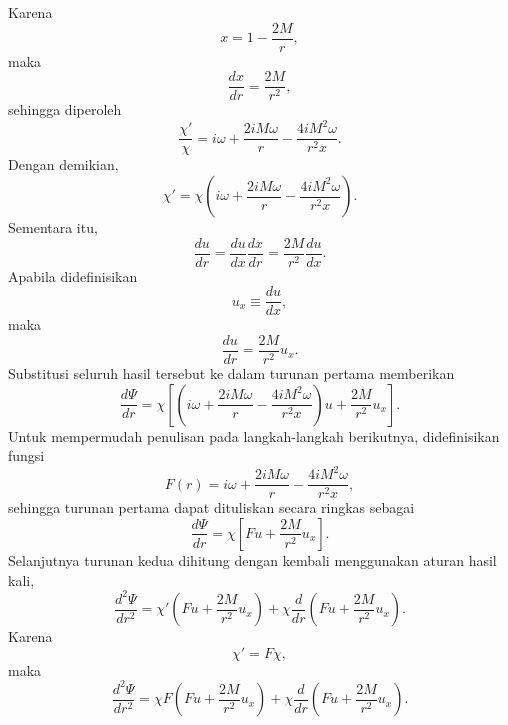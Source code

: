 Karena
\begin{equation}
    x = 1-\frac{2M}{r},
\end{equation}
maka
\begin{equation}
    \frac{dx}{dr} = \frac{2M}{r^2},
\end{equation}
sehingga diperoleh
\begin{equation}
    \boxed{ \frac{\chi'}{\chi} = i\omega + \frac{2iM\omega}{r} - \frac{4iM^2\omega}{r^2x} }.
\end{equation}
Dengan demikian,
\begin{equation}
    \boxed{ \chi' = \chi \left( i\omega + \frac{2iM\omega}{r} - \frac{4iM^2\omega}{r^2x} \right). }
\end{equation}
Sementara itu,
\begin{equation}
    \frac{du}{dr} = \frac{du}{dx} \frac{dx}{dr} = \frac{2M}{r^2} \frac{du}{dx}.
\end{equation}
Apabila didefinisikan
\begin{equation}
    u_x \equiv \frac{du}{dx},
\end{equation}
maka
\begin{equation}
    \frac{du}{dr} = \frac{2M}{r^2}u_x.
\end{equation}
Substitusi seluruh hasil tersebut ke dalam turunan pertama memberikan
\begin{equation}
    \boxed{ \frac{d\Psi}{dr} = \chi \left[ \left( i\omega + \frac{2iM\omega}{r} - \frac{4iM^2\omega}{r^2x} \right)u + \frac{2M}{r^2}u_x \right]. }
\end{equation}
Untuk mempermudah penulisan pada langkah-langkah berikutnya, didefinisikan fungsi
\begin{equation}
    F(r) = i\omega + \frac{2iM\omega}{r} - \frac{4iM^2\omega}{r^2x},
\end{equation}
sehingga turunan pertama dapat dituliskan secara ringkas sebagai
\begin{equation}
    \frac{d\Psi}{dr} = \chi \left[ Fu + \frac{2M}{r^2}u_x \right].
\end{equation}
Selanjutnya turunan kedua dihitung dengan kembali menggunakan aturan hasil kali,
\begin{equation}
    \frac{d^2\Psi}{dr^2} = \chi' \left( Fu + \frac{2M}{r^2}u_x \right) + \chi \frac{d}{dr} \left( Fu + \frac{2M}{r^2}u_x \right).
\end{equation}
Karena
\begin{equation}
    \chi'=F\chi,
\end{equation}
maka
\begin{equation}
    \frac{d^2\Psi}{dr^2} = \chi F \left( Fu + \frac{2M}{r^2}u_x \right) + \chi \frac{d}{dr} \left( Fu + \frac{2M}{r^2}u_x \right).
\end{equation}
